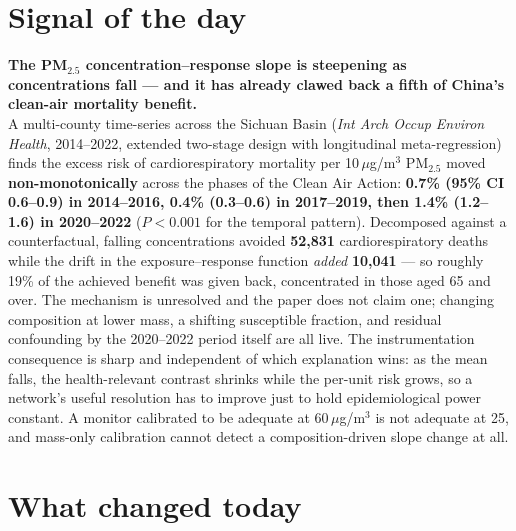 \documentclass[10pt]{article}
\begin{document}
\vspace{6mm}

\section*{\sffamily\bfseries\color{Deep}Signal of the day}
\vspace{-1.5mm}{\color{Amber}\rule{\linewidth}{1.1pt}}\vspace{2.5mm}

\begin{keybox}
{\sffamily\bfseries\small\color{Deep}The PM$_{2.5}$ concentration--response slope is steepening
as concentrations fall --- and it has already clawed back a fifth of China's clean-air
mortality benefit.}\\[1.4mm]
\footnotesize
A multi-county time-series across the Sichuan Basin (\textit{Int Arch Occup Environ Health},
2014--2022, extended two-stage design with longitudinal meta-regression) finds the excess
risk of cardiorespiratory mortality per 10\,$\mu$g/m$^3$ PM$_{2.5}$ moved
\textbf{non-monotonically} across the phases of the Clean Air Action:
\textbf{0.7\% (95\% CI 0.6--0.9) in 2014--2016, 0.4\% (0.3--0.6) in 2017--2019, then
1.4\% (1.2--1.6) in 2020--2022} ($P<0.001$ for the temporal pattern). Decomposed against a
counterfactual, falling concentrations avoided \textbf{52{,}831} cardiorespiratory deaths
while the drift in the exposure--response function \emph{added} \textbf{10{,}041} --- so
roughly 19\% of the achieved benefit was given back, concentrated in those aged 65 and over.
The mechanism is unresolved and the paper does not claim one; changing composition at lower
mass, a shifting susceptible fraction, and residual confounding by the 2020--2022 period
itself are all live. The instrumentation consequence is sharp and independent of which
explanation wins: as the mean falls, the health-relevant contrast shrinks while the
per-unit risk grows, so a network's useful resolution has to improve just to hold
epidemiological power constant. A monitor calibrated to be adequate at 60\,$\mu$g/m$^3$ is
not adequate at 25, and mass-only calibration cannot detect a composition-driven slope
change at all.
\end{keybox}

\vspace{3mm}

\section*{\sffamily\bfseries\color{Deep}What changed today}
\vspace{-1.5mm}{\color{Amber}\rule{\linewidth}{1.1pt}}\vspace{2.5mm}
\end{document}
